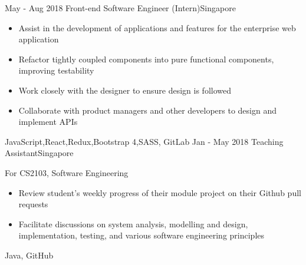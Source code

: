 %
%
%

\begin{experiences}
  \experience
    {May - Aug 2018}   {Front-end Software Engineer (Intern)}{}{Singapore}
    {} {
                      \begin{itemize}
                        \item Assist in the development of applications and features for the enterprise web application
                        \item Refactor tightly coupled components into pure functional components, improving testability
                        \item Work closely with the designer to ensure design is followed
                        \item Collaborate with product managers and other developers to design and implement APIs
                      \end{itemize}
                    }
                    {JavaScript,React,Redux,Bootstrap 4,SASS, GitLab}
  \emptySeparator
  \experience
    {Jan - May 2018} {Teaching Assistant}{}{Singapore}
    {}    {
                      For CS2103, Software Engineering
                      \begin{itemize}
                        \item Review student’s weekly progress of their module project on their Github pull requests
                        \item Facilitate discussions on system analysis, modelling and design, implementation, testing, and various software engineering principles
                      \end{itemize}
                    }
                    {Java, GitHub}
\end{experiences}
